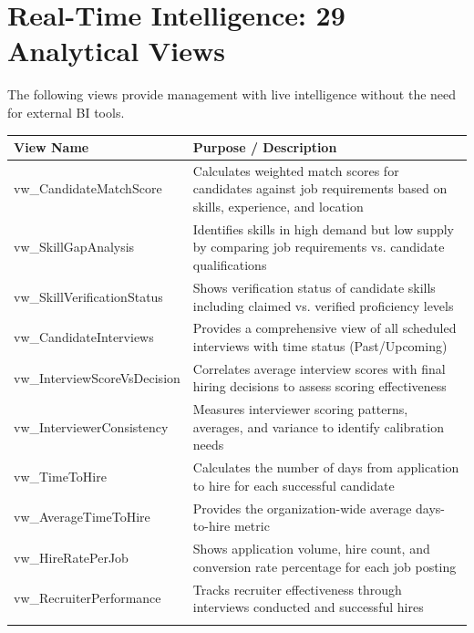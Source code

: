 \documentclass[11pt,a4paper]{article}
\begin{document}
\newpage

\section{Real-Time Intelligence: 29 Analytical Views}
The following views provide management with live intelligence without the need for external BI tools.

\noindent
{\footnotesize
\setlength{\extrarowheight}{-2pt}
\begin{tabular}{
  >{\footnotesize\RaggedRight\arraybackslash\columncolor{white}}p{52mm}
  >{\footnotesize\RaggedRight\arraybackslash\columncolor{white}}p{108mm}
}
\toprule
\rowcolor{headerblue}
\color{white}\textbf{View Name} &
\color{white}\textbf{Purpose / Description} \\
\midrule
\rowcolor{rowgray}
vw\_CandidateMatchScore & Calculates weighted match scores for candidates against job requirements based on skills, experience, and location \\[-2pt]
vw\_SkillGapAnalysis & Identifies skills in high demand but low supply by comparing job requirements vs. candidate qualifications \\[-2pt]
\rowcolor{rowgray}
vw\_SkillVerificationStatus & Shows verification status of candidate skills including claimed vs. verified proficiency levels \\[-2pt]
vw\_CandidateInterviews & Provides a comprehensive view of all scheduled interviews with time status (Past/Upcoming) \\[-2pt]
\rowcolor{rowgray}
vw\_InterviewScoreVsDecision & Correlates average interview scores with final hiring decisions to assess scoring effectiveness \\[-2pt]
vw\_InterviewerConsistency & Measures interviewer scoring patterns, averages, and variance to identify calibration needs \\[-2pt]
\rowcolor{rowgray}
vw\_TimeToHire & Calculates the number of days from application to hire for each successful candidate \\[-2pt]
vw\_AverageTimeToHire & Provides the organization-wide average days-to-hire metric \\[-2pt]
\rowcolor{rowgray}
vw\_HireRatePerJob & Shows application volume, hire count, and conversion rate percentage for each job posting \\[-2pt]
vw\_RecruiterPerformance & Tracks recruiter effectiveness through interviews conducted and successful hires \\[-2pt]
\rowcolor{rowgray}

\end{tabular}}
\end{document}
